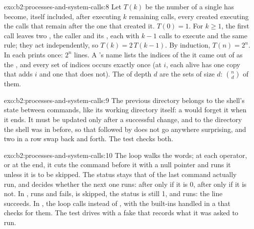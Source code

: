 \begin{solution}{exo:b2:processes-and-system-calls:8}
Let $T(k)$ be the number of  a single  has become, itself included, after executing $k$ remaining
 calls, every  created executing the calls that remain after the one that created it. $T(0) = 1$.
For $k \ge 1$, the first call leaves two , the caller and its , each with $k - 1$ calls to execute
and the same rule; they act independently, so $T(k) = 2\,T(k - 1)$. By induction, $T(n) = 2^n$.
In  each  prints once: $2^n$ lines. A 's name lists the indices of the  it came
out of as the , and every set of indices occurs exactly once (at  $i$, each  alive has one copy that
adds $i$ and one that does not). The  of depth $d$ are the sets of size $d$: $\binom{n}{d}$ of them.
\end{solution}

\begin{solution}{exo:b2:processes-and-system-calls:9}
The previous directory belongs to the shell's state between commands, like its working directory itself: a 
would forget it when it ends. It must be updated only after a successful change, and to the directory the shell was
in before, so that  followed by  does not go anywhere surprising, and two 
in a row swap back and forth. The test checks both.
\end{solution}

\begin{solution}{exo:b2:processes-and-system-calls:10}
The loop walks the words; at each operator, or at the end, it cuts the command before it with a null pointer and
runs it unless it is to be skipped. The status stays that of the last command actually run, and decides whether the
next one runs: after \code{&&} only if it is 0, after \code{||} only if it is not. In ,
 runs and fails,  is skipped, the status is still 1, and  runs: the line succeeds. In
, the loop calls  instead of , with the built-ins handled in
a  that checks for them. The test drives  with a fake  that records what it was
asked to run.
\end{solution}

